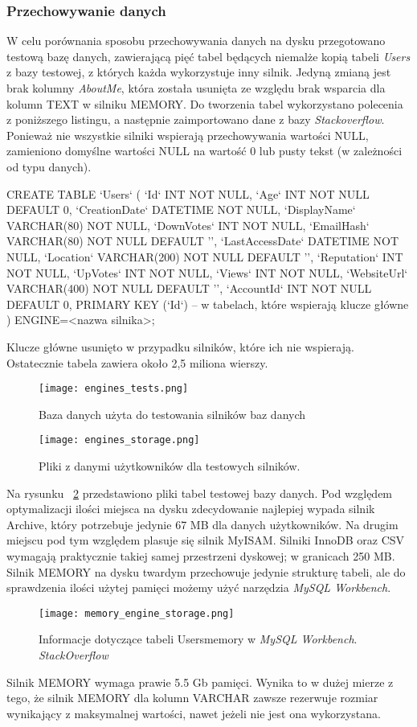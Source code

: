 \subsubsection{Przechowywanie danych}
W celu porównania sposobu przechowywania danych na dysku przegotowano testową bazę danych, zawierającą pięć tabel będących niemalże kopią tabeli \textit{Users} z bazy testowej, z których każda wykorzystuje inny silnik. Jedyną zmianą jest brak kolumny \textit{AboutMe}, która została usunięta ze względu brak wsparcia dla kolumn TEXT w silniku MEMORY. Do tworzenia tabel wykorzystano polecenia z poniższego listingu, a następnie zaimportowano dane z bazy \textit{Stackoverflow}. Ponieważ nie wszystkie silniki wspierają przechowywania wartości NULL, zamieniono domyślne wartości NULL na wartość 0 lub pusty tekst (w zależności od typu danych).
\begin{spverbatim}
	CREATE TABLE `Users` (
	`Id` INT NOT NULL,
	`Age` INT NOT NULL DEFAULT 0,
	`CreationDate` DATETIME NOT NULL,
	`DisplayName` VARCHAR(80) NOT NULL,
	`DownVotes` INT NOT NULL,
	`EmailHash` VARCHAR(80) NOT NULL DEFAULT '',
	`LastAccessDate` DATETIME NOT NULL,
	`Location` VARCHAR(200) NOT NULL DEFAULT '',
	`Reputation` INT NOT NULL,
	`UpVotes` INT NOT NULL,
	`Views` INT NOT NULL,
	`WebsiteUrl` VARCHAR(400) NOT NULL DEFAULT '',
	`AccountId` INT NOT NULL DEFAULT 0,
	PRIMARY KEY (`Id`) -- w tabelach, które wspierają klucze główne
	) ENGINE=<nazwa silnika>;
\end{spverbatim}
Klucze główne usunięto w przypadku silników, które ich nie wspierają. Ostatecznie tabela zawiera około 2,5 miliona wierszy.
\begin{figure}[!h]
	\centering
	\texttt{[image: engines\_tests.png]}
	\caption{Baza danych użyta do testowania silników baz danych}
	\label{fig:label}
\end{figure}
\begin{figure}[!h]
	\centering
	\texttt{[image: engines\_storage.png]}
	\caption{Pliki z danymi użytkowników dla testowych silników.}
	\label{fig:engines_storage}
\end{figure}

Na rysunku ~\ref{fig:engines_storage} przedstawiono pliki tabel testowej bazy danych. Pod względem optymalizacji ilości miejsca na dysku zdecydowanie najlepiej wypada silnik Archive, który potrzebuje jedynie 67 MB dla danych użytkowników. Na drugim miejscu pod tym względem plasuje się silnik MyISAM. Silniki InnoDB oraz CSV wymagają praktycznie takiej samej przestrzeni dyskowej; w granicach 250 MB. Silnik MEMORY na dysku twardym przechowuje jedynie strukturę tabeli, ale do sprawdzenia ilości użytej pamięci możemy użyć narzędzia \textit{MySQL Workbench}.
\begin{figure}[!h]
	\centering
	\texttt{[image: memory\_engine\_storage.png]}
	\caption{Informacje dotyczące tabeli Users\textunderscore memory w \textit{MySQL Workbench}. \textit{StackOverflow}}
	\label{fig:label}
\end{figure}
Silnik MEMORY wymaga prawie 5.5 Gb pamięci. Wynika to w dużej mierze z tego, że silnik MEMORY dla kolumn VARCHAR zawsze rezerwuje rozmiar wynikający z maksymalnej wartości, nawet jeżeli nie jest ona wykorzystana.




